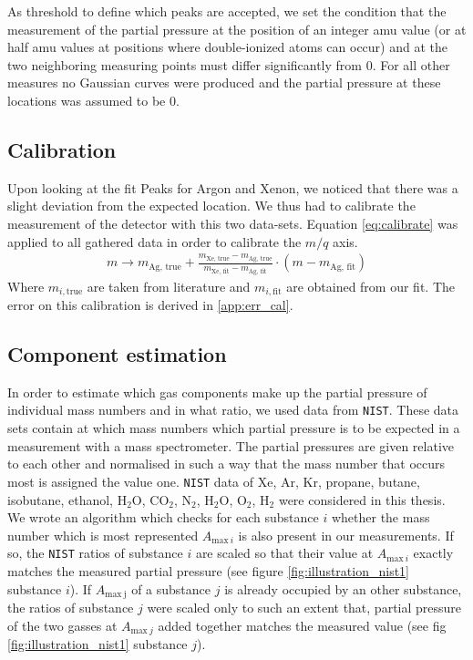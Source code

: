 As threshold to define which peaks are accepted, we set the condition that the measurement of the partial pressure at the position of an integer amu value (or at half amu values at positions where double-ionized atoms can occur) and at the two neighboring measuring points must differ significantly from 0. 
For all other measures no Gaussian curves were produced and the partial pressure at these locations was assumed to be 0.

\subsection{Calibration}
Upon looking at the fit Peaks for Argon and Xenon, we noticed that there was a slight deviation from the expected location. We thus had to calibrate the measurement of the detector with this two data-sets. Equation \eqref{eq:calibrate} was applied to all gathered data in order to calibrate the $m/q$ axis.
\begin{align}
    m \to m_\text{Ag, true} + \frac{m_\text{Xe, true} - m_\text{Ag, true}}{m_\text{Xe, fit} - m_\text{Ag, fit}} \cdot (m - m_\text{Ag, fit}) \label{eq:calibrate}
\end{align}
Where $m_{i, \text{true}}$ are taken from literature and $m_{i, \text{fit}}$ are obtained from our fit.
The error on this calibration is derived in \ref{app:err_cal}.

\subsection{Component estimation}

In order to estimate which gas components make up the partial pressure of individual mass numbers and in what ratio, we used data from \texttt{NIST}. These data sets contain at which mass numbers which partial pressure is to be expected in a measurement with a mass spectrometer. The partial pressures are given relative to each other and normalised in such a way that the mass number that occurs most is assigned the value one. \texttt{NIST} data of Xe, Ar, Kr, propane, butane, isobutane, ethanol, H$_2$O, CO$_2$, N$_2$, H$_2$O, O$_2$, H$_2$ were considered in this thesis. We wrote an algorithm which checks for each substance $i$ whether the mass number which is most represented $A_{\mathrm{max}~i}$ is also present in our measurements. If so, the \texttt{NIST} ratios of substance $i$ are scaled so that their value at $A_{\mathrm{max}~i}$ exactly matches the measured partial pressure (see figure \ref{fig:illustration_nist1} substance $i$). If $A_{\mathrm{max~j}}$ of a substance $j$ is already occupied by an other substance, the ratios of substance $j$ were scaled only to such an extent that, partial pressure of the two gasses at $A_{\mathrm{max}~j}$ added together matches the measured value (see fig \ref{fig:illustration_nist1} substance $j$).  

